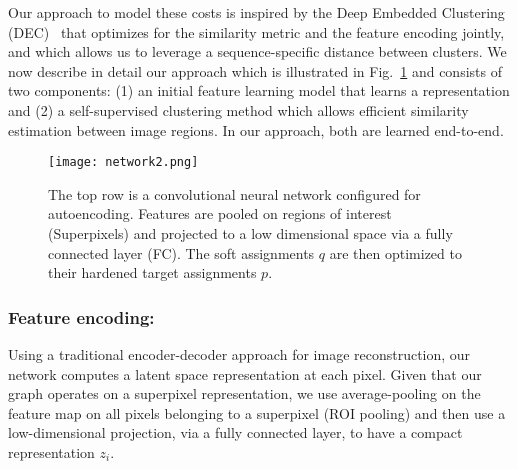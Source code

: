 Our approach to model these costs is inspired by the Deep Embedded Clustering (DEC)~\cite{xie15} that optimizes for the similarity metric and the feature encoding jointly, and which allows us to leverage a sequence-specific distance between clusters. We now describe in detail our approach which is illustrated in Fig.~\ref{fig:network} and consists of two components: (1) an initial feature learning model that learns a representation and (2) a self-supervised clustering method which allows efficient similarity estimation between image regions. In our approach, both are learned end-to-end.
\begin{figure}[b!]
\centering
\texttt{[image: network2.png]}
\caption{The top row is a convolutional neural network configured for autoencoding. Features are pooled on regions of interest (Superpixels) and projected to a low dimensional space via a fully connected layer (FC). The soft assignments $q$ are then optimized to their hardened target assignments $p$.}
\label{fig:network}
\end{figure}

\subsubsection{Feature encoding: }{
  Using a traditional encoder-decoder approach for image reconstruction, our network computes a latent space representation at each pixel.
  Given that our graph operates on a superpixel representation, we use average-pooling on the feature map on all pixels belonging to a superpixel (ROI pooling) and then use a low-dimensional projection, via a fully connected layer, to have a compact representation $z_i$.
}

